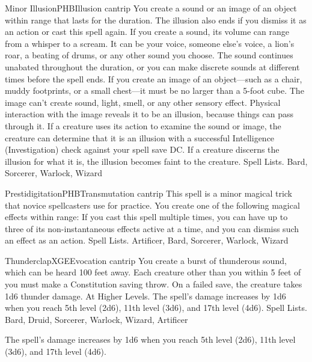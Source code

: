 \begin{spell}{Minor Illusion}{PHB}{Illusion cantrip}
{
}
You create a sound or an image of an object within range that lasts for the duration. The illusion also ends if you dismiss it as an action or cast this spell again.
If you create a sound, its volume can range from a whisper to a scream. It can be your voice, someone else’s voice, a lion’s roar, a beating of drums, or any other sound you choose. The sound continues unabated throughout the duration, or you can make discrete sounds at different times before the spell ends.
If you create an image of an object—such as a chair, muddy footprints, or a small chest—it must be no larger than a 5-foot cube. The image can’t create sound, light, smell, or any other sensory effect. Physical interaction with the image reveals it to be an illusion, because things can pass through it.
If a creature uses its action to examine the sound or image, the creature can determine that it is an illusion with a successful Intelligence (Investigation) check against your spell save DC. If a creature discerns the illusion for what it is, the illusion becomes faint to the creature.
Spell Lists. Bard, Sorcerer, Warlock, Wizard
\end{spell}

\begin{spell}{Prestidigitation}{PHB}{Transmutation cantrip}
{
}
This spell is a minor magical trick that novice spellcasters use for practice. You create one of the following magical effects within range:
If you cast this spell multiple times, you can have up to three of its non-instantaneous effects active at a time, and you can dismiss such an effect as an action.
Spell Lists. Artificer, Bard, Sorcerer, Warlock, Wizard
\end{spell}

\begin{spell}{Thunderclap}{XGE}{Evocation cantrip}
{
}
You create a burst of thunderous sound, which can be heard 100 feet away. Each creature other than you within 5 feet of you must make a Constitution saving throw. On a failed save, the creature takes 1d6 thunder damage.
At Higher Levels. The spell’s damage increases by 1d6 when you reach 5th level (2d6), 11th level (3d6), and 17th level (4d6).
Spell Lists. Bard, Druid, Sorcerer, Warlock, Wizard, Artificer

 The spell’s damage increases by 1d6 when you reach 5th level (2d6), 11th level (3d6), and 17th level (4d6).
\end{spell}

